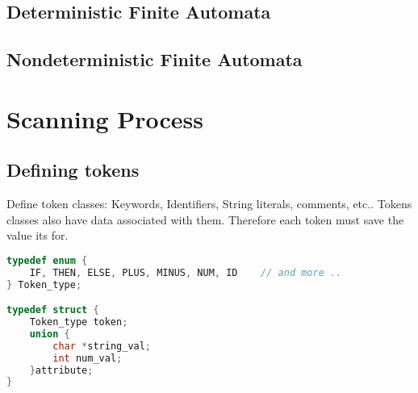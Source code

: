 \documentclass{report}
\theoremstyle{definition}
\begin{document}
		\subsection{Deterministic Finite Automata}
		\subsection{Nondeterministic Finite Automata}
	\section{Scanning Process}
		\subsection{Defining tokens}
			Define token classes: Keywords, Identifiers, String literals, comments, etc.. Tokens classes  
			also have data associated with them. Therefore each token must save the value its for.
\begin{lstlisting}[language=c]
typedef enum {
	IF, THEN, ELSE, PLUS, MINUS, NUM, ID	// and more ..
} Token_type;

typedef struct {
	Token_type token;
	union {
		char *string_val;
		int num_val;
	}attribute;
}
\end{lstlisting}		
		
\end{document}
